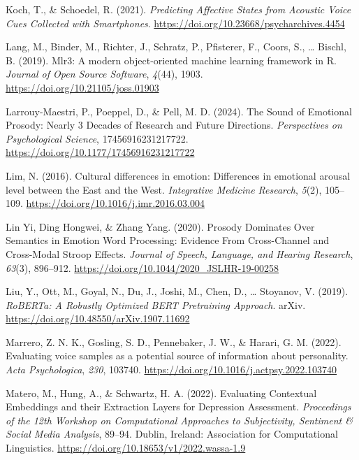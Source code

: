\documentclass[
  english,
  man,floatsintext]{apa6}
\newlength{\cslhangindent}
\newenvironment{CSLReferences}[2] %
 {%
  \setlength{\parindent}{0pt}
  \ifodd #1 \everypar{\setlength{\hangindent}{\cslhangindent}}\ignorespaces\fi
  \ifnum #2 > 0
  \setlength{\parskip}{#2\baselineskip}
  \fi
 }%
 {}
\begin{document}
\begin{CSLReferences}{1}{0}
\leavevmode{}%
Koch, T., \& Schoedel, R. (2021). \emph{Predicting {Affective States} from {Acoustic Voice Cues Collected} with {Smartphones}}. \url{https://doi.org/10.23668/psycharchives.4454}

\leavevmode{}%
Lang, M., Binder, M., Richter, J., Schratz, P., Pfisterer, F., Coors, S., \ldots{} Bischl, B. (2019). Mlr3: {A} modern object-oriented machine learning framework in {R}. \emph{Journal of Open Source Software}, \emph{4}(44), 1903. \url{https://doi.org/10.21105/joss.01903}

\leavevmode{}%
Larrouy-Maestri, P., Poeppel, D., \& Pell, M. D. (2024). The {Sound} of {Emotional Prosody}: {Nearly} 3 {Decades} of {Research} and {Future Directions}. \emph{Perspectives on Psychological Science}, 17456916231217722. \url{https://doi.org/10.1177/17456916231217722}

\leavevmode{}%
Lim, N. (2016). Cultural differences in emotion: Differences in emotional arousal level between the {East} and the {West}. \emph{Integrative Medicine Research}, \emph{5}(2), 105--109. \url{https://doi.org/10.1016/j.imr.2016.03.004}

\leavevmode{}%
Lin Yi, Ding Hongwei, \& Zhang Yang. (2020). Prosody {Dominates Over Semantics} in {Emotion Word Processing}: {Evidence From Cross-Channel} and {Cross-Modal Stroop Effects}. \emph{Journal of Speech, Language, and Hearing Research}, \emph{63}(3), 896--912. \url{https://doi.org/10.1044/2020_JSLHR-19-00258}

\leavevmode{}%
Liu, Y., Ott, M., Goyal, N., Du, J., Joshi, M., Chen, D., \ldots{} Stoyanov, V. (2019). \emph{{RoBERTa}: {A Robustly Optimized BERT Pretraining Approach}}. arXiv. \url{https://doi.org/10.48550/arXiv.1907.11692}

\leavevmode{}%
Marrero, Z. N. K., Gosling, S. D., Pennebaker, J. W., \& Harari, G. M. (2022). Evaluating voice samples as a potential source of information about personality. \emph{Acta Psychologica}, \emph{230}, 103740. \url{https://doi.org/10.1016/j.actpsy.2022.103740}

\leavevmode{}%
Matero, M., Hung, A., \& Schwartz, H. A. (2022). Evaluating {Contextual Embeddings} and their {Extraction Layers} for {Depression Assessment}. \emph{Proceedings of the 12th {Workshop} on {Computational Approaches} to {Subjectivity}, {Sentiment} \& {Social Media Analysis}}, 89--94. Dublin, Ireland: Association for Computational Linguistics. \url{https://doi.org/10.18653/v1/2022.wassa-1.9}


\end{CSLReferences}
\end{document}
